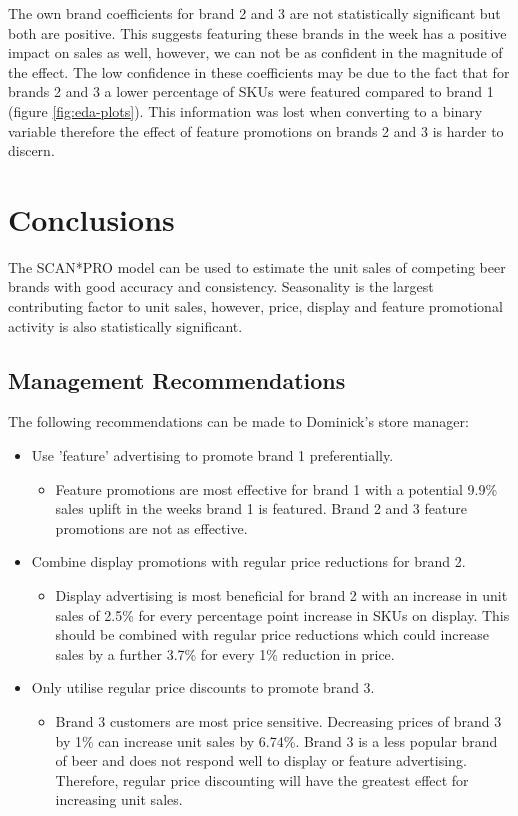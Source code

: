 \documentclass[a4paper,11pt]{article}
\begin{document}
The own brand coefficients for brand 2 and 3 are not statistically significant but both are positive. This suggests featuring these brands in the week has a positive impact on sales as well, however, we can not be as confident in the magnitude of the effect. The low confidence in these coefficients may be due to the fact that for brands 2 and 3 a lower percentage of SKUs were featured compared to brand 1 (figure \ref{fig:eda-plots}). This information was lost when converting to a binary variable therefore the effect of feature promotions on brands 2 and 3 is harder to discern.


\section{Conclusions}

The SCAN*PRO model can be used to estimate the unit sales of competing beer brands with good accuracy and consistency. Seasonality is the largest contributing factor to unit sales, however, price, display and feature promotional activity is also statistically significant. 

\subsection{Management Recommendations}
The following recommendations can be made to Dominick's store manager:
\begin{itemize}
    \item Use 'feature' advertising to promote brand 1 preferentially.
    \begin{itemize}
        \item Feature promotions are most effective for brand 1 with a potential 9.9\% sales uplift in the weeks brand 1 is featured. Brand 2 and 3 feature promotions are not as effective.
    \end{itemize}
    \item Combine display promotions with regular price reductions for brand 2.
    \begin{itemize}
        \item Display advertising is most beneficial for brand 2 with an increase in unit sales of 2.5\% for every percentage point increase in SKUs on display. This should be combined with regular price reductions which could increase sales by a further 3.7\% for every 1\% reduction in price.
    \end{itemize}
    \item Only utilise regular price discounts to promote brand 3.
    \begin{itemize}
        \item Brand 3 customers are most price sensitive. Decreasing prices of brand 3 by 1\% can increase unit sales by 6.74\%. Brand 3 is a less popular brand of beer and does not respond well to display or feature advertising. Therefore, regular price discounting will have the greatest effect for increasing unit sales. 
    \end{itemize}
    

\end{itemize}
\end{document}
